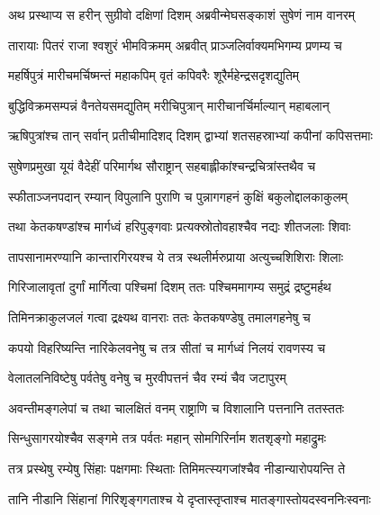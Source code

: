 
\twolineshloka
{अथ प्रस्थाप्य स हरीन् सुग्रीवो दक्षिणां दिशम्}
{अब्रवीन्मेघसङ्काशं सुषेणं नाम वानरम्} %

\twolineshloka
{तारायाः पितरं राजा श्वशुरं भीमविक्रमम्}
{अब्रवीत् प्राञ्जलिर्वाक्यमभिगम्य प्रणम्य च} %

\twolineshloka
{महर्षिपुत्रं मारीचमर्चिष्मन्तं महाकपिम्}
{वृतं कपिवरैः शूरैर्महेन्द्रसदृशद्युतिम्} %

\twolineshloka
{बुद्धिविक्रमसम्पन्नं वैनतेयसमद्युतिम्}
{मरीचिपुत्रान् मारीचानर्चिर्माल्यान् महाबलान्} %

\twolineshloka
{ऋषिपुत्रांश्च तान् सर्वान् प्रतीचीमादिशद् दिशम्}
{द्वाभ्यां शतसहस्राभ्यां कपीनां कपिसत्तमाः} %

\twolineshloka
{सुषेणप्रमुखा यूयं वैदेहीं परिमार्गथ}
{सौराष्ट्रान् सहबाह्लीकांश्चन्द्रचित्रांस्तथैव च} %

\twolineshloka
{स्फीताञ्जनपदान् रम्यान् विपुलानि पुराणि च}
{पुन्नागगहनं कुक्षिं बकुलोद्दालकाकुलम्} %

\twolineshloka
{तथा केतकषण्डांश्च मार्गध्वं हरिपुङ्गवाः}
{प्रत्यक्स्रोतोवहाश्चैव नद्यः शीतजलाः शिवाः} %

\twolineshloka
{तापसानामरण्यानि कान्तारगिरयश्च ये}
{तत्र स्थलीर्मरुप्राया अत्युच्चशिशिराः शिलाः} %

\twolineshloka
{गिरिजालावृतां दुर्गां मार्गित्वा पश्चिमां दिशम्}
{ततः पश्चिममागम्य समुद्रं द्रष्टुमर्हथ} %

\twolineshloka
{तिमिनक्राकुलजलं गत्वा द्रक्ष्यथ वानराः}
{ततः केतकषण्डेषु तमालगहनेषु च} %

\twolineshloka
{कपयो विहरिष्यन्ति नारिकेलवनेषु च}
{तत्र सीतां च मार्गध्वं निलयं रावणस्य च} %

\twolineshloka
{वेलातलनिविष्टेषु पर्वतेषु वनेषु च}
{मुरवीपत्तनं चैव रम्यं चैव जटापुरम्} %

\twolineshloka
{अवन्तीमङ्गलेपां च तथा चालक्षितं वनम्}
{राष्ट्राणि च विशालानि पत्तनानि ततस्ततः} %

\twolineshloka
{सिन्धुसागरयोश्चैव सङ्गमे तत्र पर्वतः}
{महान् सोमगिरिर्नाम शतशृङ्गो महाद्रुमः} %

\twolineshloka
{तत्र प्रस्थेषु रम्येषु सिंहाः पक्षगमाः स्थिताः}
{तिमिमत्स्यगजांश्चैव नीडान्यारोपयन्ति ते} %

\twolineshloka
{तानि नीडानि सिंहानां गिरिशृङ्गगताश्च ये}
{दृप्तास्तृप्ताश्च मातङ्गास्तोयदस्वननिःस्वनाः} %

